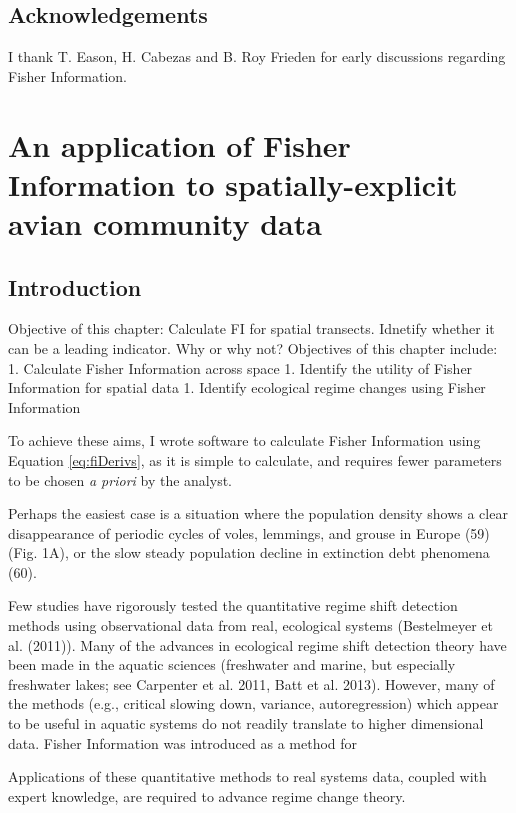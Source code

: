 \documentclass[12pt,twoside,openany]{reedthesis}
\begin{document}
\section{Acknowledgements}\label{acknowledgements}

I thank T. Eason, H. Cabezas and B. Roy Frieden for early discussions
regarding Fisher Information.

\chapter{An application of Fisher Information to spatially-explicit
avian community data}\label{fisherSpatial-chapter}

\section{Introduction}\label{introduction-2}

Objective of this chapter: Calculate FI for spatial transects. Idnetify
whether it can be a leading indicator. Why or why not? Objectives of
this chapter include: 1. Calculate Fisher Information across space 1.
Identify the utility of Fisher Information for spatial data 1. Identify
ecological regime changes using Fisher Information

To achieve these aims, I wrote software to calculate Fisher Information
using Equation \eqref{eq:fiDerivs}, as it is simple to calculate, and
requires fewer parameters to be chosen \emph{a priori} by the analyst.

Perhaps the easiest case is a situation where the population density
shows a clear disappearance of periodic cycles of voles, lemmings, and
grouse in Europe (59) (Fig. 1A), or the slow steady population decline
in extinction debt phenomena (60).

Few studies have rigorously tested the quantitative regime shift
detection methods using observational data from real, ecological systems
(Bestelmeyer et al. (2011)). Many of the advances in ecological regime
shift detection theory have been made in the aquatic sciences
(freshwater and marine, but especially freshwater lakes; see Carpenter
et al. 2011, Batt et al. 2013). However, many of the methods (e.g.,
critical slowing down, variance, autoregression) which appear to be
useful in aquatic systems do not readily translate to higher dimensional
data. Fisher Information was introduced as a method for

Applications of these quantitative methods to real systems data, coupled
with expert knowledge, are required to advance regime change theory.
\end{document}
